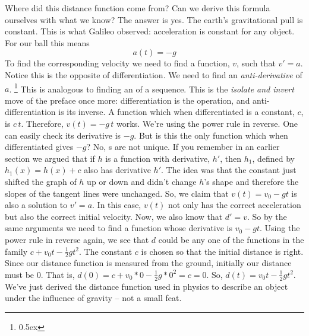 Where did this distance function come from? Can we derive this formula 
ourselves with what we know? The answer is yes. The earth's gravitational pull
is constant. This is what Galileo observed: acceleration is constant for 
any object. For our ball this means
$$
a(t) = -g 
$$
To find the corresponding velocity we need to find a function, $v$, such 
that $v' = a$. Notice this is the opposite of differentiation. We need 
to find an {\it anti-derivative\/} of $a$.%
\footnote{\kern 0.5pt \raise 0.5ex \hbox{\dag}}
{This is analogous to finding an {\it {}\/} of a sequence.}
This is the {\it isolate and invert\/} move of the preface once more:
differentiation is the operation, and anti-differentiation is its inverse.
A function which when differentiated is a constant, $c$, is $c\, t$. 
Therefore, $v(t) = -g\, t$ works. We're using the power rule in reverse. 
One can easily check its derivative 
is $-g$. But is this the only function which when differentiated gives $-g$?
No, s are not unique. If you remember in an earlier section 
we argued that if $h$ is a function with derivative, $h'$, then 
$h_1$, defined by $h_1(x) = h(x) + c$ also has derivative $h'$. The idea was 
that the constant just shifted the graph of $h$ up or down and didn't change 
$h$'s shape and therefore the slopes of the tangent lines were unchanged.
So, we claim that $v(t) = v_0 - g t$ is also a solution to $v' = a$. In this case, $v(t)$ 
not only has the correct acceleration but also the correct initial velocity.
Now, we also know that $d' = v$. So by the same arguments we need to find 
a function whose derivative is $v_0 - g t$. Using the power rule in reverse 
again, we see that $d$ could be any one of the functions in the family $c + v_0 t - \frac{1}{2} g t^2$. 
The constant $c$ is chosen so that the initial distance is right. Since our distance function is measured
from the ground, initially our distance must be $0$. That is, $d(0) = c + v_0 * 0 - \frac{1}{2} g * 0^2 = c = 0$.
So, $d(t) = v_0 t - \frac{1}{2} g t^2$. We've just derived the distance function used in physics to describe
an object under the influence of gravity -- not a small feat. 



